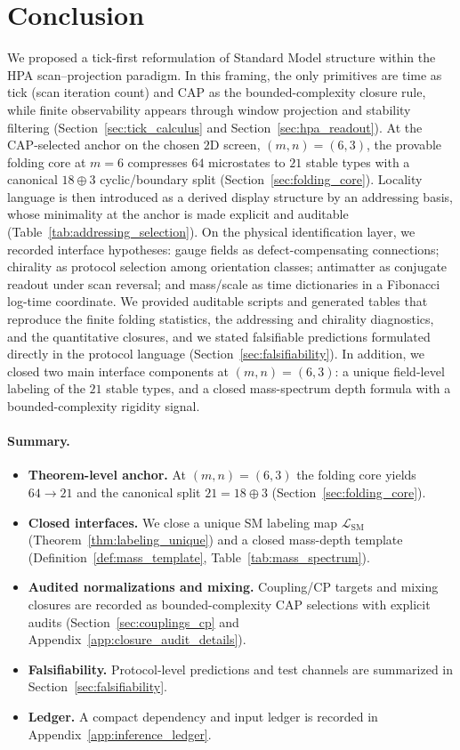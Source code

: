 
\section{Conclusion}
\label{sec:conclusion}

We proposed a tick-first reformulation of Standard Model structure within the HPA scan--projection paradigm.
In this framing, the only primitives are time as tick (scan iteration count) and CAP as the bounded-complexity closure rule, while finite observability appears through window projection and stability filtering (Section~\ref{sec:tick_calculus} and Section~\ref{sec:hpa_readout}).
At the CAP-selected anchor on the chosen $2$D screen, $(m,n)=(6,3)$, the provable folding core at $m=6$ compresses $64$ microstates to $21$ stable types with a canonical $18\oplus 3$ cyclic/boundary split (Section~\ref{sec:folding_core}).
Locality language is then introduced as a derived display structure by an addressing basis, whose minimality at the anchor is made explicit and auditable (Table~\ref{tab:addressing_selection}).
On the physical identification layer, we recorded interface hypotheses: gauge fields as defect-compensating connections; chirality as protocol selection among orientation classes; antimatter as conjugate readout under scan reversal; and mass/scale as time dictionaries in a Fibonacci log-time coordinate.
We provided auditable scripts and generated tables that reproduce the finite folding statistics, the addressing and chirality diagnostics, and the quantitative closures, and we stated falsifiable predictions formulated directly in the protocol language (Section~\ref{sec:falsifiability}).
In addition, we closed two main interface components at $(m,n)=(6,3)$: a unique field-level labeling of the $21$ stable types, and a closed mass-spectrum depth formula with a bounded-complexity rigidity signal.

\paragraph{Summary.}
\begin{itemize}
\item \textbf{Theorem-level anchor.} At $(m,n)=(6,3)$ the folding core yields $64\to 21$ and the canonical split $21=18\oplus 3$ (Section~\ref{sec:folding_core}).
\item \textbf{Closed interfaces.} We close a unique SM labeling map $\mathcal{L}_{\mathrm{SM}}$ (Theorem~\ref{thm:labeling_unique}) and a closed mass-depth template (Definition~\ref{def:mass_template}, Table~\ref{tab:mass_spectrum}).
\item \textbf{Audited normalizations and mixing.} Coupling/CP targets and mixing closures are recorded as bounded-complexity CAP selections with explicit audits (Section~\ref{sec:couplings_cp} and Appendix~\ref{app:closure_audit_details}).
\item \textbf{Falsifiability.} Protocol-level predictions and test channels are summarized in Section~\ref{sec:falsifiability}.
\item \textbf{Ledger.} A compact dependency and input ledger is recorded in Appendix~\ref{app:inference_ledger}.
\end{itemize}

